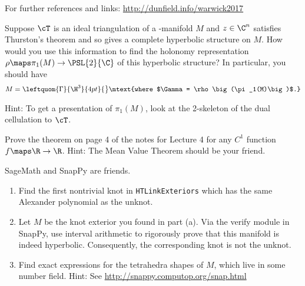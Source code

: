 \documentclass[tikz, a4paper]{nmd/hw}
\begin{document}

For further references and links: \url{http://dunfield.info/warwick2017}


\begin{problems}
\item Suppose $\cT$ is an ideal triangulation of a \3-manifold $M$ and
  $z \in \C^n$ satisfies Thurston's theorem and so gives a complete
  hyperbolic structure on $M$.  How would you use this information to
  find the holonomy representation
  $\rho \maps \pi_1(M) \to \PSL{2}{\C}$ of this hyperbolic structure? 
  In particular, you should have
  \[
    M = \leftquom{\Gamma}{\H^3}{4pt}{\big} \mtext{where $\Gamma = \rho\big(\pi_1(M)\big)$.}
  \]

  Hint: To get a presentation of $\pi_1(M)$, look at the 2-skeleton of
  the dual cellulation to $\cT$.  
  
\item Prove the theorem on page 4 of the notes for Lecture 4 for any
  $C^1$ function $f \maps \R \to \R$.  Hint: The Mean Value Theorem
  should be your friend.

\item SageMath and SnapPy are friends.
  \begin{enumerate}
  \item Find the first nontrivial knot in \texttt{HTLinkExteriors}
    which has the same Alexander polynomial as the unknot.

  \item Let $M$ be the knot exterior you found in part (a).  Via the
    verify module in SnapPy, use interval arithmetic to rigorously
    prove that this manifold is indeed hyperbolic.  Consequently, the
    corresponding knot is not the unknot.

  \item Find exact expressions for the tetrahedra shapes of
    $M$, which live in some number field.
    Hint: See \url{http://snappy.computop.org/snap.html}  

  \end{enumerate}

  
\end{problems}
\end{document}
